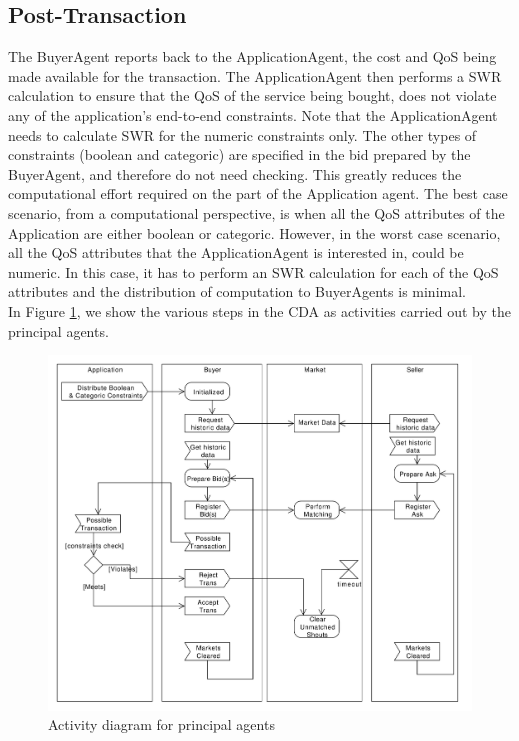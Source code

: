 \documentclass[10pt,journal,compsoc]{IEEEtran}
\begin{document}
\subsection{Post-Transaction}
The BuyerAgent reports back to the ApplicationAgent, the cost and QoS being made available for the transaction. The ApplicationAgent then performs a SWR calculation to ensure that the QoS of the service being bought, does not violate any of the application's end-to-end constraints. Note that the ApplicationAgent needs to calculate SWR for the numeric constraints only. The other types of constraints (boolean and categoric) are specified in the bid prepared by the BuyerAgent, and therefore do not need checking. This greatly reduces the computational effort required on the part of the Application agent. The best case scenario, from a computational perspective, is when all the QoS attributes of the Application are either boolean or categoric. However, in the worst case scenario, all the QoS attributes that the ApplicationAgent is  interested in, could be numeric. In this case, it has to perform an SWR calculation for each of the QoS attributes and the distribution of computation to BuyerAgents is minimal.\\

In Figure \ref{fig:cda_activity_diagram}, we show the various steps in the CDA  as activities carried out by the principal agents.
 
 \begin{figure}[h]
	\centering
	\includegraphics[scale=0.32]{drawings/CDA_Activity_Diagram.pdf}
	\caption{Activity diagram for principal agents}
	\label{fig:cda_activity_diagram}
\end{figure}	
\end{document}
